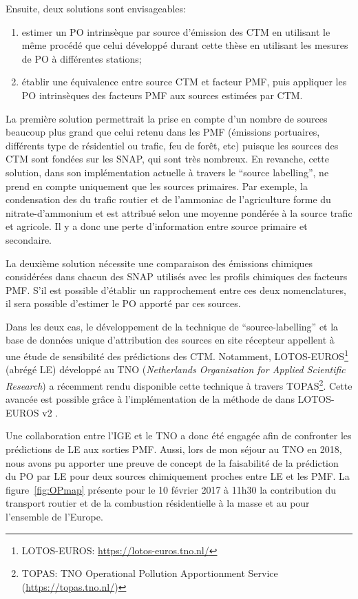 Ensuite, deux solutions sont envisageables:
\begin{enumerate}
    \item estimer un PO intrinsèque par source d'émission des CTM en utilisant le même
        procédé que celui développé durant cette thèse en utilisant les mesures de PO à
        différentes stations;
    \item établir une équivalence entre source CTM et facteur PMF, puis appliquer les
        PO intrinsèques des facteurs PMF aux sources estimées par CTM.
\end{enumerate}

La première solution permettrait la prise en compte d'un nombre de sources beaucoup plus
grand que celui retenu dans les PMF (émissions portuaires, différents type de résidentiel
ou trafic, feu de forêt, etc) puisque les sources des CTM sont fondées sur les SNAP, qui
sont très nombreux.
En revanche, cette solution, dans son implémentation actuelle à travers le ``source
labelling'', ne prend en compte uniquement que les sources primaires. Par exemple, la
condensation des  du trafic routier et de l'ammoniac de l'agriculture forme du
nitrate-d'ammonium et est attribué selon une moyenne pondérée à la source trafic et
agricole. Il y a donc une perte d'information entre source primaire et secondaire.

La deuxième solution nécessite une comparaison des émissions chimiques considérées dans
chacun des SNAP utilisés avec les profils chimiques des facteurs PMF. S'il est possible
d'établir un rapprochement entre ces deux nomenclatures, il sera possible d'estimer le PO
apporté par ces sources.

Dans les deux cas, le développement de la technique de ``source-labelling'' et la base de
données unique d'attribution des sources en site récepteur appellent à une étude de
sensibilité des prédictions des CTM. Notamment, LOTOS-EUROS\footnote{LOTOS-EUROS:
    \url{https://lotos-euros.tno.nl/}} (abrégé LE) développé au TNO (\textit{Netherlands Organisation for
Applied Scientific Research}) a récemment rendu disponible cette technique à travers TOPAS\footnote{TOPAS:
TNO Operational Pollution Apportionment Service (\url{https://topas.tno.nl/})}. Cette
avancée est possible grâce à l'implémentation de la méthode de \cite{kranenburgSource2013} dans
LOTOS-EUROS v2 \autocite{mandersCurriculum2017}.

Une collaboration entre l'IGE et le TNO a donc été engagée afin de confronter les
prédictions de LE aux sorties PMF. Aussi, lors de mon séjour au TNO en 2018, nous
avons pu apporter une preuve de concept de la faisabilité de la prédiction du PO par
LE pour deux sources chimiquement proches entre LE et les PMF.
La figure~\ref{fig:OPmap} présente pour le 10 février 2017 à 11h30 la contribution du
transport routier et de la combustion résidentielle à la masse et au \PODTTv{} pour
l'ensemble de l'Europe.

